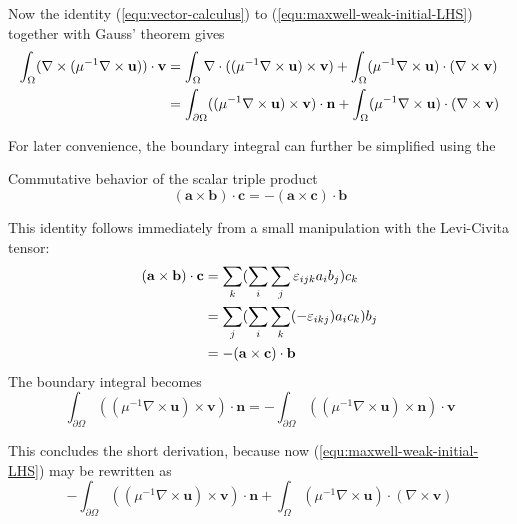 \documentclass[11pt, a4paper]{article}
\begin{document}
Now the identity (\ref{equ:vector-calculus}) to (\ref{equ:maxwell-weak-initial-LHS})
together with Gauss' theorem gives
\begin{align}
    \int_{\Omega} (\nabla \times ({\mu^{-1} \nabla \times \mathbf{u}})) \cdot \mathbf{v} &=
    \int_{\Omega} \nabla \cdot (({\mu^{-1} \nabla \times \mathbf{u}}) \times \mathbf{v})
    + \int_{\Omega} ({\mu^{-1} \nabla \times \mathbf{u}}) \cdot (\nabla \times \mathbf{v}) \notag \\
    &= \int_{\partial \Omega} (({\mu^{-1} \nabla \times \mathbf{u}}) \times \mathbf{v}) \cdot \mathbf{n}
    + \int_{\Omega} ({\mu^{-1} \nabla \times \mathbf{u}}) \cdot (\nabla \times \mathbf{v}) \notag \\
\end{align}

For later convenience, the boundary integral can further be simplified using the
\begin{fancybox}{Commutative behavior of the scalar triple product}
    \begin{equation}
        (\mathbf{a} \times \mathbf{b}) \cdot \mathbf{c} = - (\mathbf{a} \times \mathbf{c}) \cdot \mathbf{b} \label{equ:vector-algebra}
    \end{equation}
\end{fancybox}
This identity follows immediately from a small manipulation with the Levi-Civita
tensor:
\begin{align}
    (\mathbf{a} \times \mathbf{b}) \cdot \mathbf{c} &= \sum_k (\sum_i \sum_j \varepsilon_{ijk} a_i b_j) c_k \notag \\
     &= \sum_j (\sum_i \sum_k (-\varepsilon_{ikj}) a_i c_k) b_j \notag \\ 
     &= - (\mathbf{a} \times \mathbf{c}) \cdot \mathbf{b} 
\end{align}
The boundary integral becomes 
\begin{equation}
    \int_{\partial \Omega} (({\mu^{-1} \nabla \times \mathbf{u}}) \times \mathbf{v}) \cdot \mathbf{n}
    = - \int_{\partial \Omega} (({\mu^{-1} \nabla \times \mathbf{u}}) \times \mathbf{n}) \cdot \mathbf{v}
\end{equation}

This concludes the short derivation, because now (\ref{equ:maxwell-weak-initial-LHS})
may be rewritten as
\begin{equation}
    - \int_{\partial \Omega} (({\mu^{-1} \nabla \times \mathbf{u}}) \times \mathbf{v}) \cdot \mathbf{n}
    + \int_{\Omega} ({\mu^{-1} \nabla \times \mathbf{u}}) \cdot (\nabla \times \mathbf{v})
\end{equation}
\end{document}
